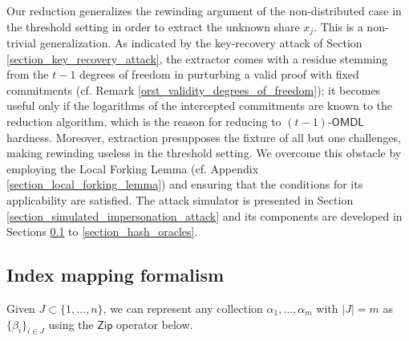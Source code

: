 \documentclass[10pt, psamsfonts, reqno]{amsart}
\theoremstyle{definition}
\theoremstyle{remark}
\numberwithin{equation}{section}
\begin{document}
Our reduction generalizes the rewinding argument
of the non-distributed case in the threshold setting
in order to extract the unknown share $x_j$.
This is a non-trivial generalization.
As indicated by the key-recovery attack
of Section \ref{section_key_recovery_attack},
the extractor comes with a residue
stemming from the $t-1$ degrees of freedom in purturbing a valid proof
with fixed commitments
(cf. Remark \ref{orst_validity_degrees_of_freedom});
it becomes useful only if the logarithms
of the intercepted commitments
are known to the reduction algorithm,
which is the reason for reducing to
$(t-1)$-$\textsf{OMDL}$ hardness.
Moreover, extraction presupposes the fixture of
all but one challenges,
making rewinding useless
in the threshold setting. We overcome this obstacle
by employing the Local Forking Lemma
(cf. Appendix \ref{section_local_forking_lemma})
and ensuring that the conditions for its applicability
are satisfied. The attack simulator is presented
in Section \ref{section_simulated_impersonation_attack}
and its components are developed in Sections
\ref{section_index_mapping} to
\ref{section_hash_oracles}.


\subsection{Index mapping formalism}\label{section_index_mapping}

Given $J \subset \{1, \dots, n\}$,
we can represent any collection
$\alpha_1, \dots, \alpha_m$ with $|J|=m$
as $\{\beta_i\}_{i \in J}$ using the
$\mathsf{Zip}$ operator below.
\end{document}
